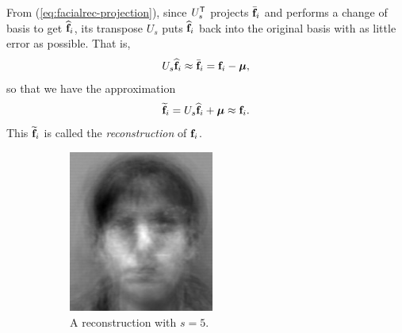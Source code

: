 From (\ref{eq:facialrec-projection}), since $U_s^{\mathsf T}$ projects $\bar{\mathbf{f}}_i$ and performs a change of basis to get $\widehat{\mathbf{f}}_i$, its transpose $U_s$ puts $\widehat{\mathbf{f}}_i$ back into the original basis with as little error as possible.
That is,
\[
U_s \widehat{\mathbf{f}}_i \approx \bar{\mathbf{f}}_i = \mathbf{f}_i - \boldsymbol{\mu},
\]
so that we have the approximation
\begin{equation}
\widetilde{\mathbf{f}}_i = U_s \widehat{\mathbf{f}}_i + \boldsymbol{\mu} \approx \mathbf{f}_i.
\label{eq:facialrec-reconstruct}
\end{equation}
This $\widetilde{\mathbf{f}}_i$ is called the \emph{reconstruction} of $\mathbf{f}_i$.

\begin{figure}[H]
\begin{subfigure}{0.32\textwidth}
    \includegraphics[width=\textwidth]{figures/rebuiltThirtySecond.png}
    \caption{A reconstruction with $s=5$.}
\end{subfigure}
\begin{subfigure}{0.32\textwidth}

\end{subfigure}
\end{figure}
